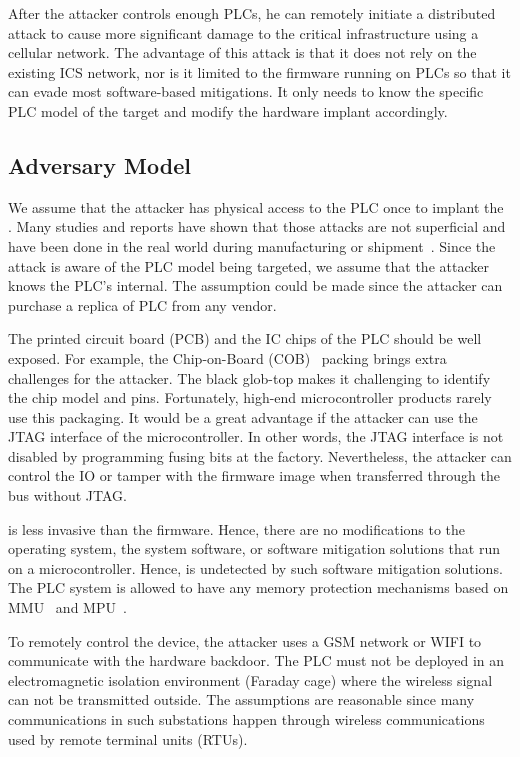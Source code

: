 After the attacker controls enough PLCs, he can remotely initiate a distributed attack to cause more significant damage to the critical infrastructure using a cellular network. The advantage of this attack is that it does not rely on the existing ICS network, nor is it limited to the firmware running on PLCs so that it can evade most software-based mitigations. It only needs to know the specific PLC model of the target and modify the hardware implant accordingly.


\subsection{Adversary Model}

We assume that the attacker has physical access to the PLC once to implant the \name. Many studies and reports have shown that those attacks are not superficial and have been done in the real world during manufacturing or shipment~\cite{harrison2021malicious, o2015special, robertson2018big}. Since the attack is aware of the PLC model being targeted, we assume that the attacker knows the PLC's internal. The assumption could be made since the attacker can purchase a replica of PLC from any vendor. 


The printed circuit board (PCB) and the IC chips of the PLC should be well exposed. For example, the Chip-on-Board (COB)~\cite{lau1994chip} packing brings extra challenges for the attacker. The black glob-top makes it challenging to identify the chip model and pins. Fortunately, high-end microcontroller products rarely use this packaging. It would be a great advantage if the attacker can use the JTAG interface of the microcontroller. In other words, the JTAG interface is not disabled by programming fusing bits at the factory. Nevertheless, the attacker can control the IO or tamper with the firmware image when transferred through the bus without JTAG.

\name is less invasive than the firmware. Hence, there are no modifications to the operating system, the system software, or software mitigation solutions that run on a microcontroller. Hence, \name is undetected by such software mitigation solutions. The PLC system is allowed to have any memory protection mechanisms based on MMU~\cite{shalan2000dynamic} and MPU~\cite{kim2018securing}.

To remotely control the device, the attacker uses a GSM network or WIFI to communicate with the hardware backdoor. The PLC must not be deployed in an electromagnetic isolation environment (Faraday cage) where the wireless signal can not be transmitted outside. The assumptions are reasonable since many communications in such substations happen through wireless communications used by remote terminal units (RTUs).



